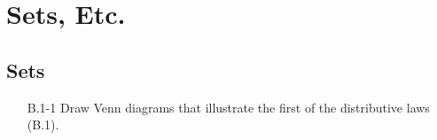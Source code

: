 \chapter{Sets, Etc.}

\section{Sets}

\begin{enumerate}

\item[B.1{-}1] {Draw Venn diagrams that illustrate the first of the distributive
laws (B.1).}

\begin{framed}
\begin{center}
\def\firstcircle{(0,0) circle (0.5cm)}
\def\secondcircle{(60:0.75cm) circle (0.5cm)}
\def\thirdcircle{(0:0.75cm) circle (0.5cm)}


\end{center}
\end{framed}
\end{enumerate}
